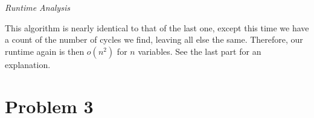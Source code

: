 \documentclass[11pt, letterpaper]{article}
\begin{document}
\begin{enumerate}
\pagebreak

\begin{center}
\textit{Runtime Analysis}
\end{center}

\quad This algorithm is nearly identical to that of the last one, except this time we have a count of the number of cycles we find, leaving all else the same. Therefore, our runtime again is then $o(n^2)$ for $n$ variables. See the last part for an explanation.

\end{enumerate}

\pagebreak

\section*{Problem 3}
\end{document}
